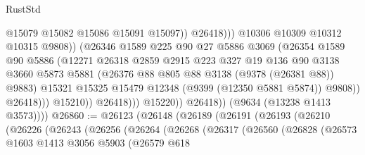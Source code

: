 \begin{lexlean}{RustStd}
\begin{coremodule}
                                            @15079
                                            @15082
                                            @15086
                                            @15091
                                            @15097))
                                        @26418)))
                                  @10306
                                  @10309
                                  @10312
                                  @10315
                                  @9808))
                              (@26346
                                @1589
                                @225
                                @90
                                @27
                                @5886
                                @3069
                                (@26354
                                  @1589
                                  @90
                                  @5886
                                  (@12271
                                    @26318
                                    @2859
                                    @2915
                                    @223
                                    @327
                                    @19
                                    @136
                                    @90
                                    @3138
                                    @3660
                                    @5873
                                    @5881
                                    (@26376 @88 @805 @88 @3138 (@9378 (@26381 @88)) @9883)
                                    @15321
                                    @15325
                                    @15479
                                    @12348
                                    (@9399 (@12350 @5881 @5874))
                                    @9808))
                                @26418)))
                          @15210))
                      @26418)))
                @15220))
            @26418))
        (@9634 (@13238 @1413 @3573))))
@26860 := @26123
    (@26148
      (@26189
        (@26191
          (@26193
            (@26210
              (@26226
                (@26243
                  (@26256
                    (@26264
                      (@26268
                        (@26317
                          (@26560
                            (@26828
                              (@26573
                                @1603
                                @1413
                                @3056
                                @5903
                                (@26579
                                  @618

\end{coremodule}
\end{lexlean}

